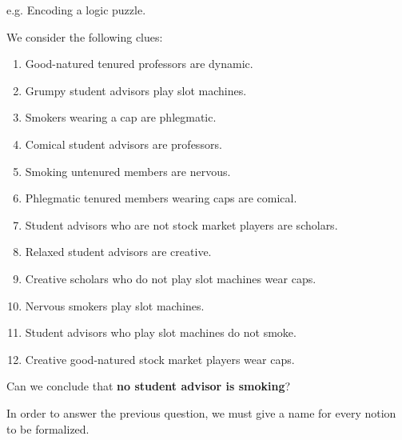 \begin{example}
    e.g. Encoding a logic puzzle. \vspace{7pt}

    We consider the following clues:
    \begin{enumerate}
        \item Good-natured tenured professors are dynamic.
        \item Grumpy student advisors play slot machines.
        \item Smokers wearing a cap are phlegmatic.
        \item Comical student advisors are professors.
        \item Smoking untenured members are nervous.
        \item Phlegmatic tenured members wearing caps are comical.
        \item Student advisors who are not stock market players are scholars.
        \item Relaxed student advisors are creative.
        \item Creative scholars who do not play slot machines wear caps.
        \item Nervous smokers play slot machines.
        \item Student advisors who play slot machines do not smoke.
        \item Creative good-natured stock market players wear caps.
    \end{enumerate} \vspace{7pt}

    Can we conclude that \textbf{no student advisor is smoking}? \vspace{7pt}

    In order to answer the previous question, we must give a name for every notion to be formalized. \vspace{7pt}


\end{example}
